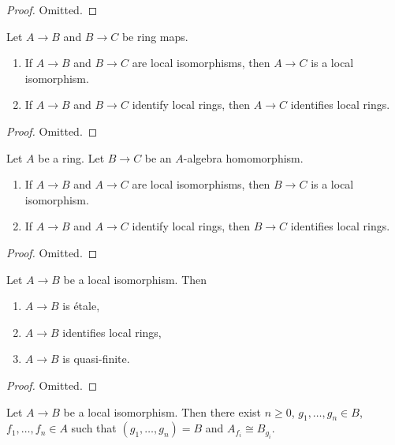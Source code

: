 \begin{proof}
Omitted.
\end{proof}

\begin{lemma}
\label{lemma-composition-local-isomorphism}
Let $A \to B$ and $B \to C$ be ring maps.
\begin{enumerate}
\item If $A \to B$ and $B \to C$ are local isomorphisms, then $A \to C$
is a local isomorphism.
\item If $A \to B$ and $B \to C$ identify local rings, then $A \to C$
identifies local rings.
\end{enumerate}
\end{lemma}

\begin{proof}
Omitted.
\end{proof}

\begin{lemma}
\label{lemma-local-isomorphism-permanence}
Let $A$ be a ring. Let $B \to C$ be an $A$-algebra homomorphism.
\begin{enumerate}
\item If $A \to B$ and $A \to C$ are local isomorphisms, then $B \to C$
is a local isomorphism.
\item If $A \to B$ and $A \to C$ identify local rings, then $B \to C$
identifies local rings.
\end{enumerate}
\end{lemma}

\begin{proof}
Omitted.
\end{proof}

\begin{lemma}
\label{lemma-local-isomorphism-implies}
Let $A \to B$ be a local isomorphism. Then
\begin{enumerate}
\item $A \to B$ is \'etale,
\item $A \to B$ identifies local rings,
\item $A \to B$ is quasi-finite.
\end{enumerate}
\end{lemma}

\begin{proof}
Omitted.
\end{proof}

\begin{lemma}
\label{lemma-structure-local-isomorphism}
Let $A \to B$ be a local isomorphism. Then there exist $n \geq 0$,
$g_1, \ldots, g_n \in B$, $f_1, \ldots, f_n \in A$ such that
$(g_1, \ldots, g_n) = B$ and $A_{f_i} \cong B_{g_i}$.
\end{lemma}

